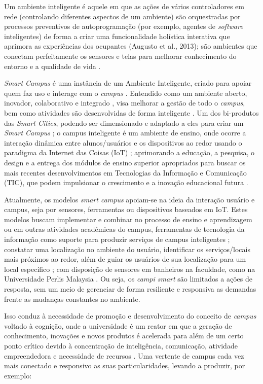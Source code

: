 \documentclass[portuguese]{textolivre}
\begin{document}
Um ambiente inteligente é aquele em que as ações de vários controladores em rede (controlando diferentes aspectos de um ambiente) são orquestradas por processos preventivos de autoprogramação (por exemplo, agentes de \textit{software} inteligentes) de forma a criar uma funcionalidade holística interativa que aprimora as experiências dos ocupantes \cite{augusto2013}(Augusto et al., 2013); são ambientes que conectam perfeitamente os sensores e telas para melhorar conhecimento do entorno e a qualidade de vida \cite{delorenzo2017}.

\textit{Smart Campus} é uma instância de um Ambiente Inteligente, criado para apoiar quem faz uso e interage com o \textit{campus} \cite{augusto2021}. Entendido como um ambiente aberto, inovador, colaborativo e integrado \cite{nobrega2021}, visa melhorar a gestão de todo o \textit{campus}, bem como atividades são desenvolvidas de forma inteligente \cite{musa2021}. Um dos bi-produtos das \textit{Smart Cities}, podendo ser dimensionado e adaptado a eles para criar um \textit{Smart Campus} \cite{pagliaro2016}; o campus inteligente é um ambiente de ensino, onde ocorre a interação dinâmica entre alunos/usuários e os dispositivos ao redor usando o paradigma da Internet das Coisas (IoT) \cite{hadwan2020}; aprimorando a educação, a pesquisa, o design e a entrega dos módulos de ensino superior apropriados para buscar os mais recentes desenvolvimentos em Tecnologias da Informação e Comunicação (TIC), que podem impulsionar o crescimento e a inovação educacional futura \cite{mustafa2021}.

Atualmente, os modelos \textit{smart campus} apoiam-se na ideia da interação usuário e campus, seja por sensores, ferramentas ou dispositivos baseados em IoT. Estes modelos buscam implementar e combinar no processo de ensino e aprendizagem ou em outras atividades acadêmicas do campus, ferramentas de tecnologia da informação como suporte para produzir serviços de campus inteligentes \cite{madyatmadja2021}; constatar uma localização no ambiente do usuário, identificar os serviços/locais mais próximos ao redor, além de guiar os usuários de sua localização para um local específico \cite{hadwan2020}; com disposição de sensores em banheiros na faculdade, como na Universidade Perlis Malaysia \cite{mansur2021}. Ou seja, os \textit{campi smart} são limitados a ações de resposta, sem um meio de gerenciar de forma resiliente e responsiva as demandas frente as mudanças constantes no ambiente.

Isso conduz à necessidade de promoção e desenvolvimento do conceito de \textit{campus} voltado à cognição, onde a universidade é um reator em que a geração de conhecimento, inovações e novos produtos é acelerada para além de um certo ponto crítico devido à concentração de inteligência, comunicação, atividade empreendedora e necessidade de recursos \cite{vasetskaya2020}. Uma vertente de campus cada vez mais conectado e responsivo as suas particularidades, levando a produzir, por exemplo:
\end{document}
